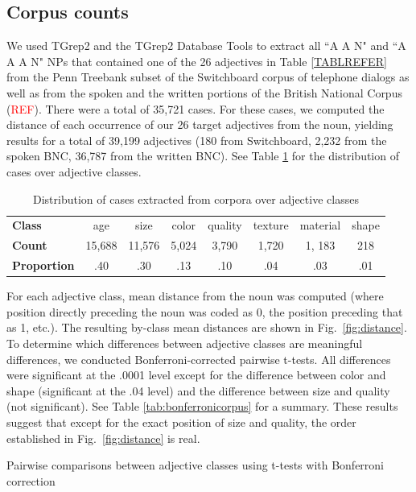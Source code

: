 \documentclass{pnastwo}
\newcommand{\tableref}[1]{Table \ref{#1}}
\newcommand{\figref}[1]{Fig.~\ref{#1}}
\newcommand{\red}[1]{\textcolor{Red}{#1}}
\begin{document}
\begin{article}
\begin{materials}
\section{Corpus counts} 

We used TGrep2 \cite{rohde2005} and the TGrep2 Database Tools \cite{degenjaeger-tdt} to extract all ``A A N" and ``A A A N" NPs that contained one of the 26 adjectives in Table \ref{TABLREFER} from the Penn Treebank subset of the Switchboard corpus of telephone dialogs \cite{godfrey1992} as well as from the spoken and the written portions of the British National Corpus (\red{REF}). There were a total of 35,721 cases. For these cases, we computed the distance of each occurrence of our 26 target adjectives from the noun, yielding results for a total of 39,199 adjectives (180 from Switchboard, 2,232 from the spoken BNC, 36,787 from the written BNC).  See \tableref{tab:adjdist} for the distribution of cases over adjective classes.

\begin{table}
	\caption{Distribution of cases extracted from corpora over adjective classes}
	\begin{tabular}{l c c c c c c c}
	\textbf{Class} & age & size & color & quality & texture & material & shape \\
	\textbf{Count} & 15,688 & 11,576 & 5,024 & 3,790 & 1,720 & 1, 183 & 218 \\
	\textbf{Proportion} & .40 & .30 & .13 & .10 & .04 & .03 & .01
	\end{tabular}
\label{tab:adjdist}
\end{table}


For each adjective class, mean distance from the noun was computed (where position directly preceding the noun was coded as 0, the position preceding that as 1, etc.). The resulting by-class mean distances are shown in \figref{fig:distance}. To determine which differences between adjective classes are meaningful differences, we conducted Bonferroni-corrected pairwise t-tests. All differences were significant at the .0001 level except for the difference between color and shape (significant at the .04 level) and the difference between size and quality (not significant). See \tableref{tab:bonferronicorpus} for a summary. These results suggest that except for the exact position of size and quality, the order established in \figref{fig:distance} is real.

\begin{table}
\caption{Pairwise comparisons between adjective classes using t-tests with Bonferroni correction}


\end{table}
\end{materials}
\end{article}
\end{document}
